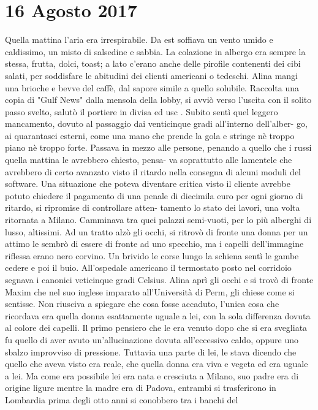 \section{16 Agosto 2017}
Quella mattina l'aria era irrespirabile. Da est soffiava un vento umido e caldissimo, un
misto di salsedine e sabbia. La colazione in albergo era sempre la stessa, frutta, dolci, toast; a lato
c'erano anche delle pirofile contenenti dei cibi salati, per soddisfare le abitudini dei clienti americani o
tedeschi. Alina mangi una brioche e bevve del caffè, dal sapore simile a quello solubile.
Raccolta una copia di "Gulf News" dalla mensola della lobby, si avviò verso l'uscita con il solito passo
svelto, salutò il portiere in divisa ed usc .
Subito sentì quel leggero mancamento, dovuto al passaggio dai venticinque gradi all'interno dell'alber-
go, ai quarantasei esterni, come una mano che prende la gola e stringe nè troppo piano nè troppo forte.
Passava in mezzo alle persone, penando a quello che i russi quella mattina le avrebbero chiesto, pensa-
va soprattutto alle lamentele che avrebbero di certo avanzato visto il ritardo nella consegna di alcuni
moduli del software. Una situazione che poteva diventare critica visto il cliente avrebbe potuto chiedere
il pagamento di una penale di diecimila euro per ogni giorno di ritardo, si ripromise di controllare atten-
tamento lo stato dei lavori, una volta ritornata a Milano. Camminava tra quei palazzi semi-vuoti, per lo
più alberghi di lusso, altissimi. Ad un tratto alzò gli occhi, si ritrovò di fronte una donna per un attimo
le sembrò di essere di fronte ad uno specchio, ma i capelli dell'immagine riflessa erano nero corvino.
Un brivido le corse lungo la schiena sentì le gambe cedere e poi il buio.
All'ospedale americano il termostato posto nel corridoio segnava i canonici veticinque gradi Celsius.
Alina aprì gli occhi e si trovò di fronte Maxim che nel suo inglese imparato all'Università di Perm, gli
chiese come si sentisse. Non riusciva a spiegare che cosa fosse accaduto, l'unica cosa che ricordava era
quella donna esattamente uguale a lei, con la sola differenza dovuta al colore dei capelli. Il primo
pensiero che le era venuto dopo che si era svegliata fu quello di aver avuto un'allucinazione dovuta
all'eccessivo caldo, oppure uno sbalzo improvviso di pressione. Tuttavia una parte di lei, le stava
dicendo che quello che aveva visto era reale, che quella donna era viva e vegeta ed era uguale a lei.
Ma come era possibile lei era nata e cresciuta a Milano, suo padre era di origine ligure mentre la madre
era di Padova, entrambi si trasferirono in Lombardia prima degli otto anni si conobbero tra i banchi del
